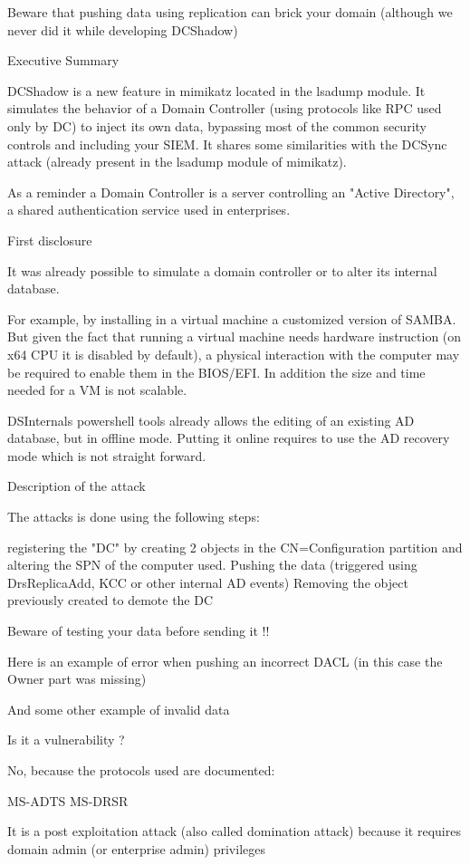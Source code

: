 Beware that pushing data using replication can brick your domain (although we never did it while developing DCShadow)

Executive Summary

DCShadow is a new feature in mimikatz located in the lsadump module. It simulates the behavior of a Domain Controller (using protocols like RPC used only by DC) to inject its own data, bypassing most of the common security controls and including your SIEM. It shares some similarities with the DCSync attack (already present in the lsadump module of mimikatz).

As a reminder a Domain Controller is a server controlling an "Active Directory", a shared authentication service used in enterprises.

First disclosure

It was already possible to simulate a domain controller or to alter its internal database.

For example, by installing in a virtual machine a customized version of SAMBA. But given the fact that running a virtual machine needs hardware instruction (on x64 CPU it is disabled by default), a physical interaction with the computer may be required to enable them in the BIOS/EFI. In addition the size and time needed for a VM is not scalable.

DSInternals powershell tools already allows the editing of an existing AD database, but in offline mode. Putting it online requires to use the AD recovery mode which is not straight forward.

Description of the attack

The attacks is done using the following steps:

registering the "DC" by creating 2 objects in the CN=Configuration partition and altering the SPN of the computer used.
Pushing the data (triggered using DrsReplicaAdd, KCC or other internal AD events)
Removing the object previously created to demote the DC


Beware of testing your data before sending it !!

Here is an example of error when pushing an incorrect DACL (in this case the Owner part was missing)

And some other example of invalid data

Is it a vulnerability ?

No, because the protocols used are documented:


MS-ADTS
MS-DRSR

It is a post exploitation attack (also called domination attack) because it requires domain admin (or enterprise admin) privileges

